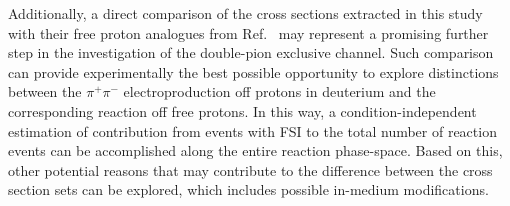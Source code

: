 Additionally, a direct comparison of the cross sections extracted in this study with their free proton analogues from Ref.~\cite{Fed_an_note:2017,Fed_paper_2018} may represent a promising further step in the investigation of the double-pion exclusive channel. Such comparison can provide experimentally the best possible opportunity to explore distinctions between the $\pi^{+}\pi^{-}$ electroproduction off protons in deuterium and the corresponding reaction off free protons. In this way, a condition-independent estimation of contribution from events with FSI to the total number of reaction events can be accomplished along the entire reaction phase-space. Based on this, other potential reasons that may contribute to the difference between the cross section sets can be explored, which includes possible in-medium modifications.




